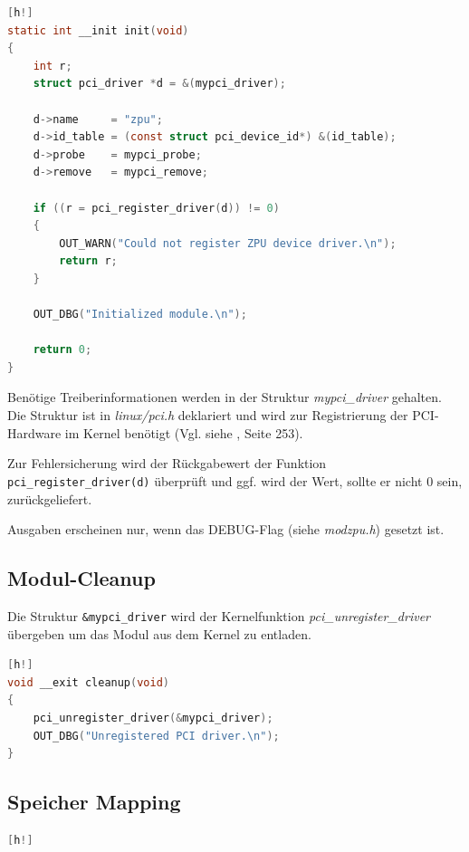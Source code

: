 \documentclass[11pt]{scrartcl}
\begin{document}
\begin{lstlisting}[language=C, firstnumber=67, label=modzpu_initfunc, caption=modzpu Init-Funktion][h!]
static int __init init(void)
{
	int r;
	struct pci_driver *d = &(mypci_driver);

	d->name     = "zpu";
	d->id_table = (const struct pci_device_id*) &(id_table);
	d->probe    = mypci_probe;
	d->remove   = mypci_remove;

	if ((r = pci_register_driver(d)) != 0)
	{
		OUT_WARN("Could not register ZPU device driver.\n");
		return r;
	}

	OUT_DBG("Initialized module.\n");

	return 0;
}
\end{lstlisting}

Benötige Treiberinformationen werden in der Struktur \textit{mypci\_driver} gehalten. Die Struktur ist in \textit{linux/pci.h} deklariert und wird zur Registrierung der PCI-Hardware im Kernel benötigt (Vgl. siehe \cite{script_hwstp}, Seite 253).
 
Zur Fehlersicherung wird der Rückgabewert der Funktion \texttt{pci\_register\_driver(d)} überprüft und ggf. wird der Wert, sollte er nicht 0 sein, zurückgeliefert. 

Ausgaben erscheinen nur, wenn das DEBUG-Flag (siehe \textit{modzpu.h}) gesetzt ist. 
\subsection{Modul-Cleanup}
Die Struktur \texttt{\&mypci\_driver} wird der Kernelfunktion \textit{pci\_unregister\_driver} übergeben um das Modul aus dem Kernel zu entladen. 

\begin{lstlisting}[language=C, firstnumber=67, label=modzpu_cleanupfunc, caption=modzpu Cleanup-Funktion][h!]
void __exit cleanup(void)
{
	pci_unregister_driver(&mypci_driver);
	OUT_DBG("Unregistered PCI driver.\n");
}
\end{lstlisting}

\subsection{Speicher Mapping}

\begin{lstlisting}[language=C, firstnumber=67, label=modzpu_cleanupfunc, caption=modzpu Cleanup-Funktion][h!]

\end{lstlisting}
\end{document}
